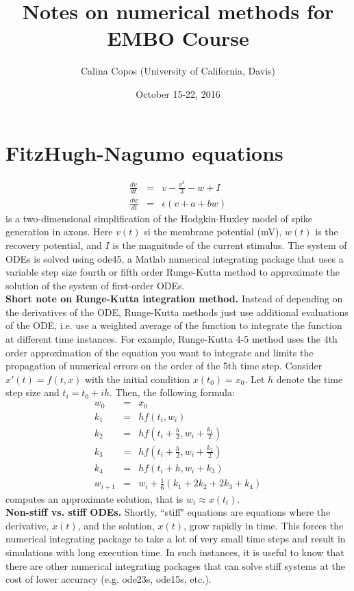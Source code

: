 \documentclass[11pt]{article}
\title{Notes on numerical methods for EMBO Course}
\author{Calina Copos (University of California, Davis)}
\date{October 15-22, 2016}
\begin{document}
\maketitle

\section*{FitzHugh-Nagumo equations}
\begin{eqnarray*}
\frac{dv}{dt} &=& v - \frac{v^3}{3} - w + I \\
\frac{dw}{dt} &=& \epsilon (v+a+bw) 
\end{eqnarray*}
is a two-dimensional simplification of the Hodgkin-Huxley model of spike generation in axons. Here $v(t)$ si the membrane potential (mV), $w(t)$ is the recovery potential, and $I$ is the magnitude of the current stimulus. The system of ODEs is solved using ode45, a Matlab numerical integrating package that uses a variable step size fourth or fifth order Runge-Kutta method to approximate the solution of the system of first-order ODEs. \\

\noindent \textbf{Short note on Runge-Kutta integration method.} Instead of depending on the derivatives of the ODE, Runge-Kutta methods just use additional evaluations of the ODE, i.e. use a weighted average of the function to integrate the function at different time instances. For example, Runge-Kutta 4-5 method uses the 4th order approximation of the equation you want to integrate and limits the propagation of numerical errors on the order of the 5th time step. Consider $x'(t) = f(t,x)$ with the initial condition $x(t_0) = x_0$. Let $h$ denote the time step size and $t_i = t_0 + ih$. Then, the following formula:
\begin{eqnarray*}
w_0 &=& x_0 \\
k_1 &=& h f(t_i,w_i) \\
k_2 &=& h f(t_i + \frac{h}{2}, w_i + \frac{k_1}{2}) \\
k_3 &=& h f(t_i + \frac{h}{2}, w_i + \frac{k_2}{2}) \\
k_4 &=& h f(t_i + h, w_i + k_3) \\
w_{i+1} &=& w_i + \frac{1}{6} (k_1 + 2k_2 + 2k_3 + k_4) 
\end{eqnarray*}
computes an approximate solution, that is $w_i \approx x(t_i)$.\\


\noindent \textbf{Non-stiff vs. stiff ODEs.} Shortly, ``stiff" equations are equations where the derivative, $\dot{x}(t)$, and the solution, $x(t)$, grow rapidly in time. This forces the numerical integrating package to take a lot of very small time steps and result in simulations with long execution time. In such instances, it is useful to know that there are other numerical integrating packages that can solve stiff systems at the cost of lower accuracy (e.g. ode23s, ode15s, etc.).\\
\end{document}
